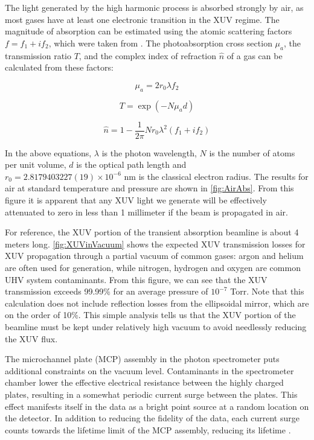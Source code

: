 The light generated by the high harmonic process is absorbed strongly by air, as most gases have at least one electronic transition in the XUV regime. The magnitude of absorption can be estimated using the atomic scattering factors $f = f_1 + i f_2$, which were taken from \cite{henkeXRayInteractionsPhotoabsorption1993}. The photoabsorption cross section $\mu_a$, the transmission ratio $T$, and the complex index of refraction $\hat{n}$ of a gas can be calculated from these factors:

\begin{equation}
\mu_a = 2 r_0 \lambda f_2
\label{eqn:PhotoCrossSection}
\end{equation}

\begin{equation}
T = \exp\left( -N \mu_a d \right)
\label{eqn:BeersLaw}
\end{equation}

\begin{equation}
\hat{n} = 1 - \frac{1}{2 \pi} N r_0 \lambda^2 \left(f_1 + i f_2\right)
\label{eqn:IndexfromASF}
\end{equation}

In the above equations, $\lambda$ is the photon wavelength, $N$ is the number of atoms per unit volume, $d$ is the optical path length and $r_0=2.8179403227(19) \times 10^{-6} \text{ nm}$ is the classical electron radius. The results for air at standard temperature and pressure are shown in \cref{fig:AirAbs}. From this figure it is apparent that any XUV light we generate will be effectively attenuated to zero in less than 1 millimeter if the beam is propagated in air.

For reference, the XUV portion of the transient absorption beamline is about 4 meters long. \cref{fig:XUVinVacuum} shows the expected XUV transmission losses for XUV propagation through a partial vacuum of common gases: argon and helium are often used for generation, while nitrogen, hydrogen and oxygen are common UHV system contaminants. From this figure, we can see that the XUV transmission exceeds 99.99\% for an average pressure of $10^{-7}$ Torr. Note that this calculation does not include reflection losses from the ellipsoidal mirror, which are on the order of 10\%. This simple analysis tells us that the XUV portion of the beamline must be kept under relatively high vacuum to avoid needlessly reducing the XUV flux.

The microchannel plate (MCP) assembly in the photon spectrometer puts additional constraints on the vacuum level.  Contaminants in the spectrometer chamber lower the effective electrical resistance between the highly charged plates, resulting in a somewhat periodic current surge between the plates. This effect manifests itself in the data as a bright point source at a random location on the detector. In addition to reducing the fidelity of the data, each current surge counts towards the lifetime limit of the MCP assembly, reducing its lifetime \cite{ladislaswizaMicrochannelPlateDetectors1979}.

